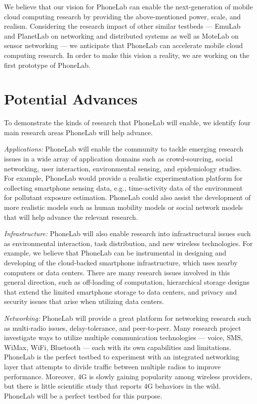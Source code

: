We believe that our vision for PhoneLab can enable the next-generation of mobile
cloud computing research by providing the above-mentioned power, scale, and
realism. Considering the research impact of other similar testbeds --- EmuLab
and PlanetLab on networking and distributed systems as well as MoteLab on sensor
networking --- we anticipate that PhoneLab can accelerate mobile cloud computing
research. In order to make this vision a reality, we are working on the
first prototype of PhoneLab.

\section{Potential Advances} To demonstrate the kinds of research that PhoneLab
will enable, we identify four main research areas PhoneLab will help advance. 

\emph{Applications:} PhoneLab will enable the community to tackle emerging
research issues in a wide array of application domains such as crowd-sourcing,
social networking, user interaction, environmental sensing, and epidemiology
studies. For example, PhoneLab would provide a realistic experimentation
platform for collecting smartphone sensing data, e.g., time-activity data of the
environment for pollutant exposure estimation. PhoneLab could also assist
the development of more realistic models such as human mobility models or
social network models that will help advance the relevant research.

\emph{Infrastructure:} PhoneLab will also enable research into infrastructural
issues such as environmental interaction, task distribution, and new wireless
technologies. For example, we believe that PhoneLab can be instrumental in
designing and developing of the cloud-backed smartphone infrastructure, which
uses nearby computers or data centers. There are many research issues involved
in this general direction, such as off-loading of computation, hierarchical
storage designs that extend the limited smartphone storage to data centers, and
privacy and security issues that arise when utilizing data centers.

\emph{Networking:} PhoneLab will provide a great platform for networking
research such as multi-radio issues, delay-tolerance, and peer-to-peer.
Many research project investigate ways to utilize multiple communication
technologies --- voice, SMS, WiMax, WiFi, Bluetooth --- each with its own
capabilities and limitations. PhoneLab is the perfect testbed to experiment
with an integrated networking layer that attempts to divide traffic between
multiple radios to improve performance. Moreover, 4G is slowly gaining
popularity among wireless providers, but there is little scientific study
that reports 4G behaviors in the wild. PhoneLab will be a perfect testbed for
this purpose.

